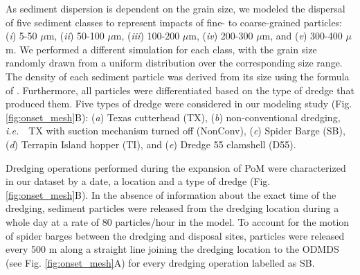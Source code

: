 \documentclass[preprint,12pt,authoryear]{elsarticle}
\newcommand{\ie}{{\it i.e.}\ }
\begin{document}
As sediment dispersion is dependent on the grain size, we modeled the dispersal of five sediment classes to represent impacts of fine- to coarse-grained particles: (\textit{i}) 5-50 $\mu$m, (\textit{ii}) 50-100 $\mu$m, (\textit{iii}) 100-200 $\mu$m, (\textit{iv}) 200-300 $\mu$m, and (\textit{v}) 300-400 $\mu$m. We performed a  different simulation for each class, with the grain size randomly drawn from a uniform distribution over the corresponding size range. The density of each sediment particle was derived from its size using the formula of \cite{hamilton1982sound}. Furthermore, all particles were differentiated based on the type of dredge that produced them. Five types of dredge were considered in our modeling study (Fig. \ref{fig:onset_mesh}B): (\textit{a}) Texas cutterhead (TX), (\textit{b}) non-conventional dredging, \ie~TX with suction mechanism turned off (NonConv), (\textit{c}) Spider Barge (SB), (\textit{d}) Terrapin Island hopper (TI), and (\textit{e}) Dredge 55 clamshell (D55).

Dredging operations performed during the expansion of PoM were characterized in our dataset by a date, a location and  a type of dredge (Fig. \ref{fig:onset_mesh}B). In the absence of information about the exact time of the dredging, sediment particles were released from the dredging location during a whole day at a rate of 80 particles/hour in the model. To account for the motion of spider barges between the dredging and disposal sites, particles were released every 500 m along a straight line joining the dredging location to the ODMDS (see Fig. \ref{fig:onset_mesh}A) for every dredging operation labelled as SB.
\end{document}

